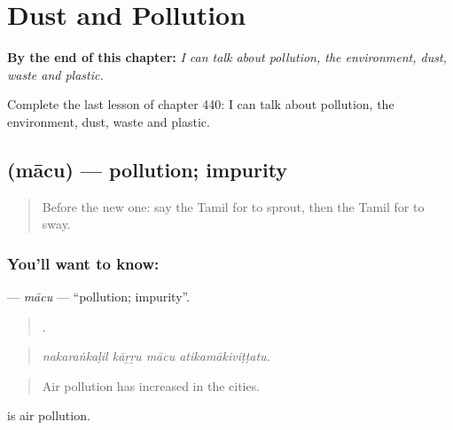 
\chapter{Dust and Pollution}
\label{ch:ta-dust-and-pollution}

\begin{chapteropening}
\textbf{By the end of this chapter:} \emph{I can talk about pollution, the environment, dust, waste and plastic.}

Complete the last lesson of chapter 440: I can talk about pollution, the environment, dust, waste and plastic.
\end{chapteropening}

\section[\texorpdfstring{\ta{மாசு} (mācu)}{மாசு (mācu)}]{ (mācu) — pollution; impurity}

\label{lesson:TA-C440-macu}



\begin{quote}
Before the new one: say the Tamil for to sprout, then the Tamil for to sway.
\end{quote}

\subsection*{You'll want to know: }
\textbf{} — \emph{mācu} — \textquotedblleft{}pollution; impurity\textquotedblright{}.

\begin{quote}
   .
\end{quote}

\begin{quote}
\emph{nakaraṅkaḷil kāṟṟu mācu atikamākiviṭṭatu.}
\end{quote}

\begin{quote}
Air pollution has increased in the cities.
\end{quote}

  is air pollution.

